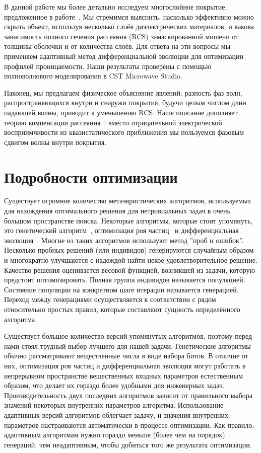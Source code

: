 В данной работе мы более детально исследуем многослойное покрытие,
предложенное в работе~\cite{semouchkina_sphere_multilayer}. Мы
стремимся выяснить, насколько эффективно можно скрыть объект,
используя несколько слоёв диэлектрических материалов, и какова
зависимость полного сечения рассеяния (RCS) замаскированной
мишени от толщины оболочки и от количества слоёв. Для ответа на эти
вопросы мы применяем адаптивный метод дифференциальной эволюции для
оптимизации профилей проницаемости. Наши результаты проверены с
помощью полноволнового моделирования в CST Microwave
Studio.\cite{CST-web}
 
Наконец, мы предлагаем физическое объяснение явлений: разность фаз
волн, распространяющихся внутри и снаружи покрытия, будучи целым
числом длин падающей волны, приводит к уменьшению RCS. Наше описание
дополняет теорию компенсации рассеяния~\cite{alu}: вместо
отрицательной электрической восприимчивости из квазистатического
приближения мы пользуемся фазовым сдвигом волны внутри
покрытия.

\section{Подробности оптимизации}
Существует огромное количество метаэвристических алгоритмов,
используемых для нахождения оптимального решения для нетривиальных
задач в очень большом пространстве поиска. Некоторые алгоритмы,
которые стоит упомянуть, это генетический
алгоритм~\cite{Goldberg-GA-1989}, оптимизация роя
частиц~\cite{Kennedy-PSO-1995} и дифференциальная
эволюция~\cite{Storn-DE-first-1997}. Многие из таких алгоритмов
используют метод ''проб и ошибок''. Несколько пробных решений (или
индивидов) генерируются случайным образом и многократно улучшаются с
надеждой найти некое удовлетворительное решение. Качество решения
оценивается весовой функцией, возникшей из задачи, которую предстоит
оптимизировать. Полная группа индивидов называется
популяцией. Состояние популяции на конкретном шаге итерации называется
генерацией. Переход между генерациями осуществляется в соответствии с
рядом относительно простых правил, которые составляют сущность
определённого алгоритма.


Существует большое количество версий упомянутых алгоритмов, поэтому
перед нами стоял трудный выбор лучшего для нашей задачи. Генетические
алгоритмы обычно рассматривают вещественные числа в виде набора
битов. В отличие от них, оптимизация роя частиц и дифференциальная
эволюция могут работать в непрерывном пространстве вещественных
входных параметров естественным образом, что делает их гораздо более
удобными для инженерных задач. Производительность двух последних
алгоритмов зависит от правильного выбора значений некоторых внутренних
параметров алгоритма. Использование адаптивных версий алгоритмов
облегчает задачу, и значения внутренних параметров настраиваются
автоматически в процессе оптимизации. Как правило, адаптивным
алгоритмам нужно гораздо меньше (более чем на порядок) генераций, чем
неадаптивным, чтобы добиться того же результата
оптимизации.~\cite{Jingqiao-JADE-2009,Zhan-APSO-2009}


